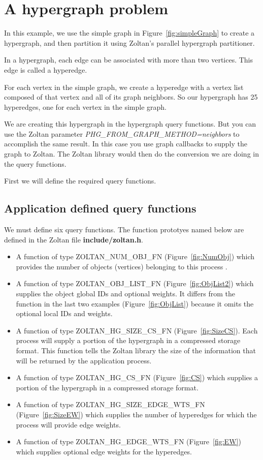\clearpage
\section{A hypergraph problem}

In this example, we use the simple graph in 
Figure~\ref{fig:simpleGraph} to create a hypergraph, and
then partition it using Zoltan's parallel hypergraph
partitioner.  

In a hypergraph, each edge can be associated with more than
two vertices.  This edge is called a hyperedge.

For each vertex in the simple graph, we create a hyperedge
with a vertex list composed of that vertex and all of its
graph neighbors.  So our hypergraph has 25 hyperedges, one
for each vertex in the simple graph.

We are creating this hypergraph in the hypergraph query functions.
But you can use the Zoltan parameter
\emph{PHG\_FROM\_GRAPH\_METHOD=neighbors} to accomplish the same
result.  In this case you use graph callbacks to supply the 
graph to Zoltan.
The Zoltan library would then do the conversion we are doing
in the query functions.

First we will define the required query functions.

\subsection{Application defined query functions}

We must define six query functions.  The function prototyes named 
below are defined in the Zoltan file \textbf{include/zoltan.h}.

\begin{itemize}
\item A function of type ZOLTAN\_NUM\_OBJ\_FN (Figure~\ref{fig:NumObj}) which provides the number of objects (vertices) belonging to this process .
\item A function of type ZOLTAN\_OBJ\_LIST\_FN (Figure~\ref{fig:ObjList2}) which supplies the object global IDs and optional weights.  It differs from the function in the last two examples (Figure~\ref{fig:ObjList}) because it omits the optional local IDs and weights.
\item A function of type ZOLTAN\_HG\_SIZE\_CS\_FN (Figure~\ref{fig:SizeCS}).  Each process will supply a portion of the hypergraph in a compressed storage format.  This function tells the Zoltan library the size of the information that will be returned by the application process.
\item A function of type ZOLTAN\_HG\_CS\_FN (Figure~\ref{fig:CS}) which supplies a portion of the hypergraph in a compressed storage format.
\item A function of type ZOLTAN\_HG\_SIZE\_EDGE\_WTS\_FN (Figure~\ref{fig:SizeEW}) which supplies the number of hyperedges for which the process will provide edge weights.
\item A function of type ZOLTAN\_HG\_EDGE\_WTS\_FN (Figure~\ref{fig:EW}) which supplies optional edge weights for the hyperedges.
\end{itemize}

